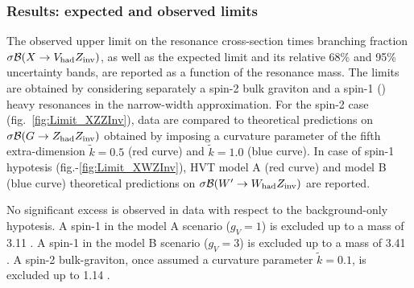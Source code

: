 \clearpage

\subsubsection{Results: expected and observed limits}


The observed upper limit on the resonance cross-section times branching fraction $\sigma \mathcal{B} (X \rightarrow V_{\text{had}} Z_{\text{inv}})$, as well as the expected limit and its relative 68\% and 95\% uncertainty bands, are reported as a function of the resonance mass. The limits are obtained by considering separately a spin-2 bulk graviton and a spin-1 (\Wp) heavy resonances in the narrow-width approximation. For the spin-2 case (fig.~\ref{fig:Limit_XZZInv}), data are compared to theoretical predictions on $\sigma \mathcal{B} (G \rightarrow Z_{\text{had}} Z_{\text{inv}})$ obtained by imposing a curvature parameter of the fifth extra-dimension $\tilde{k} = 0.5$ (red curve) and $\tilde{k} = 1.0$ (blue curve). In case of spin-1 hypotesis (fig.-\ref{fig:Limit_XWZInv}), HVT model A (red curve) and model B (blue curve) theoretical predictions on $\sigma \mathcal{B} (W' \rightarrow W_{\text{had}} Z_{\text{inv}})$ are reported.

\noindent No significant excess is observed in data with respect to the background-only hypotesis. A spin-1 \Wp in the model A scenario ($g_V=1$) is excluded up to a mass of 3.11 \TeV. A spin-1 \Wp in the model B scenario ($g_V=3$) is excluded up to a mass of 3.41 \TeV. A spin-2 bulk-graviton, once assumed a curvature parameter $\tilde{k} = 0.1$, is excluded up to 1.14 \TeV.



